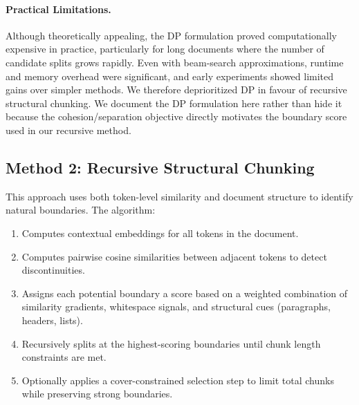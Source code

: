 \documentclass[conference]{IEEEtran}
\begin{document}
\paragraph{Practical Limitations.} Although theoretically appealing, the DP
formulation proved computationally expensive in practice, particularly for
long documents where the number of candidate splits grows rapidly. Even
with beam-search approximations, runtime and memory overhead were
significant, and early experiments showed limited gains over simpler
methods. We therefore deprioritized DP in favour of recursive structural
chunking. We document the DP formulation here rather than hide it because
the cohesion/separation objective directly motivates the boundary score
used in our recursive method.

\subsection{Method 2: Recursive Structural Chunking}

This approach uses both token-level similarity and document structure to
identify natural boundaries. The algorithm:
\begin{enumerate}
    \item Computes contextual embeddings for all tokens in the document.
    \item Computes pairwise cosine similarities between adjacent tokens
    to detect discontinuities.
    \item Assigns each potential boundary a score based on a weighted
    combination of similarity gradients, whitespace signals, and structural
    cues (paragraphs, headers, lists).
    \item Recursively splits at the highest-scoring boundaries until chunk
    length constraints are met.
    \item Optionally applies a cover-constrained selection step to limit
    total chunks while preserving strong boundaries.
\end{enumerate}
\end{document}
